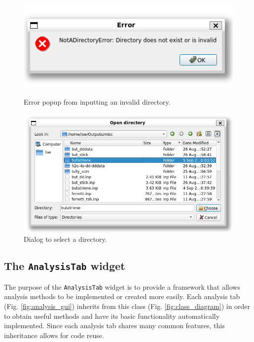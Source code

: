 \documentclass[12pt]{article}
\begin{document}
\begin{figure}[h]
    \centering
    \begin{minipage}[t]{.47\textwidth}
        \centering
        \includegraphics[width=\textwidth]{img/dir_error.png}
        \caption{Error popup from inputting an invalid directory.}
        \label{fig:dir_error}
    \end{minipage}\hfill\begin{minipage}[t]{.47\textwidth}
        \centering
        \includegraphics[width=\textwidth]{img/dir_edit.png}
        \caption{Dialog to select a directory.}
        \label{fig:dir_edit}
    \end{minipage}
\end{figure}

\subsection{The \texttt{AnalysisTab} widget}\label{ssec:analysistab}

The purpose of the \texttt{AnalysisTab} widget is to provide a framework that allows analysis methods to be implemented or created more easily. Each analysis tab (Fig. \ref{fig:analysis_gui}) inherits from this class (Fig. \ref{fig:class_diagram}) in order to obtain useful methods and have its basic functionality automatically implemented. Since each analysis tab shares many common features, this inheritance allows for code reuse.
\end{document}
